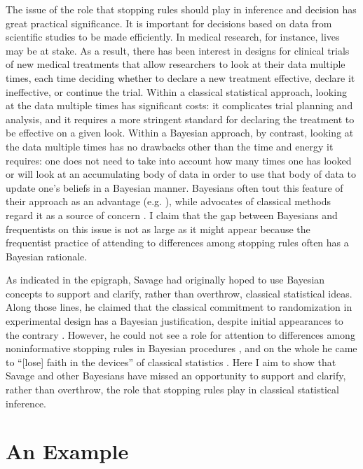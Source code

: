 \documentclass{article}
\theoremstyle{definition}
\begin{document}
The issue of the role that stopping rules should play in inference and decision has great practical significance.
It is important for decisions based on data from scientific studies to be made efficiently.
In medical research, for instance, lives may be at stake.
As a result, there has been interest in designs for clinical trials of new medical treatments that allow researchers to look at their data multiple times, each time deciding whether to declare a new treatment effective, declare it ineffective, or continue the trial.
Within a classical statistical approach, looking at the data multiple times has significant costs: it complicates trial planning and analysis, and it requires a more stringent standard for declaring the treatment to be effective on a given look.
Within a Bayesian approach, by contrast, looking at the data multiple times has no drawbacks other than the time and energy it requires: one does not need to take into account how many times one has looked or will look at an accumulating body of data in order to use that body of data to update one's beliefs in a Bayesian manner.
Bayesians often tout this feature of their approach as an advantage (e.g. \citealp{edwards+al63,berry06}), while advocates of classical methods regard it as a source of concern \citep{mayo+kruse01}.
I claim that the gap between Bayesians and frequentists on this issue is not as large as it might appear because the frequentist practice of attending to differences among stopping rules often has a Bayesian rationale.

As indicated in the epigraph, Savage had originally hoped to use Bayesian concepts to support and clarify, rather than overthrow, classical statistical ideas.
Along those lines, he claimed that the classical commitment to randomization in experimental design has a Bayesian justification, despite initial appearances to the contrary \citep[585]{savage61}.
However, he could not see a role for attention to differences among noninformative stopping rules in Bayesian procedures \citep[239]{edwards+al63}, and on the whole he came to ``[lose] faith in the devices'' of classical statistics \citep[iv]{savage72}.
Here I aim to show that Savage and other Bayesians have missed an opportunity to support and clarify, rather than overthrow, the role that stopping rules play in classical statistical inference.

\section{An Example} \label{sec:stopping}
\end{document}
